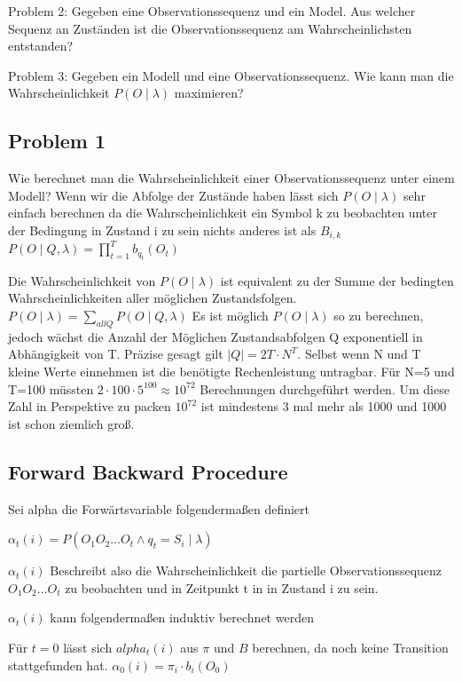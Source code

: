 Problem 2:
Gegeben eine Observationssequenz und ein Model. Aus welcher Sequenz an Zuständen ist die Observationssequenz 
am Wahrscheinlichsten entstanden?

Problem 3:
Gegeben ein Modell und eine Observationssequenz.
Wie kann man die Wahrscheinlichkeit $P(O \mid \lambda)$ maximieren?



\subsection*{Problem 1}
Wie berechnet man die Wahrscheinlichkeit einer Observationssequenz 
unter einem Modell?
Wenn wir die Abfolge der Zustände haben lässt sich $P(O \mid \lambda)$
sehr einfach berechnen da die Wahrscheinlichkeit ein Symbol k zu beobachten 
unter der Bedingung in Zustand i zu sein nichts anderes ist als $B_{i,k}$
$P(O \mid Q, \lambda) =  \prod_{t=1}^{T} b_{q_t}(O_t)$

Die Wahrscheinlichkeit von $P(O \mid \lambda)$ ist equivalent zu der 
Summe der bedingten Wahrscheinlichkeiten aller möglichen Zustandsfolgen.
$P(O \mid \lambda) = \sum_{all Q} P(O \mid Q, \lambda )$
Es ist möglich $P(O \mid \lambda)$ so zu berechnen, jedoch wächst die 
Anzahl der Möglichen Zustandsabfolgen Q exponentiell in Abhängigkeit von T.
Präzise gesagt gilt $|Q| = 2T \cdot N^T$. Selbst wenn N und T kleine Werte einnehmen
ist die benötigte Rechenleistung untragbar. Für N=5 und T=100
müssten $2 \cdot 100 \cdot 5^{100} \approx 10^{72}$ Berechnungen durchgeführt werden.
Um diese Zahl in Perspektive zu packen $10^{72}$ ist mindestens 3 mal mehr als 1000 und 1000 ist schon ziemlich groß.

\subsection*{Forward Backward Procedure}
Sei alpha die Forwärtsvariable folgendermaßen definiert

$\alpha_t(i) = P(O_1 O_2 \dots O_t \wedge q_t = S_i \mid \lambda)$

$\alpha_t(i)$ Beschreibt also die Wahrscheinlichkeit die partielle Observationssequenz
$O_1 O_2 \dots O_t$ zu beobachten und in Zeitpunkt t in in Zustand i zu sein.

$\alpha_t(i)$ kann folgendermaßen induktiv berechnet werden

Für $t=0$ lässt sich $alpha_t(i)$ aus $\pi$ und $B$ berechnen, da noch keine Transition 
stattgefunden hat. 
$\alpha_0(i) = \pi_i \cdot b_i(O_0)$

